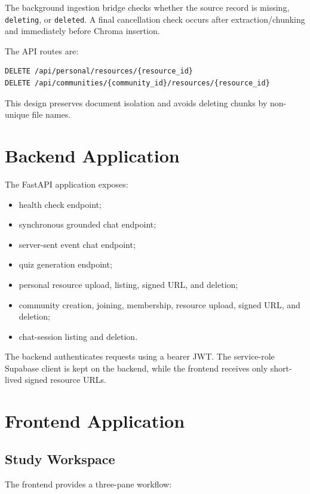 \documentclass[11pt,a4paper]{article}
\begin{document}
The background ingestion bridge checks whether the source record is missing,
\texttt{deleting}, or \texttt{deleted}. A final cancellation check occurs after
extraction/chunking and immediately before Chroma insertion.

The API routes are:

\begin{lstlisting}[language={}]
DELETE /api/personal/resources/{resource_id}
DELETE /api/communities/{community_id}/resources/{resource_id}
\end{lstlisting}

This design preserves document isolation and avoids deleting chunks by
non-unique file names.

\section{Backend Application}

The FastAPI application exposes:

\begin{itemize}[leftmargin=*]
  \item health check endpoint;
  \item synchronous grounded chat endpoint;
  \item server-sent event chat endpoint;
  \item quiz generation endpoint;
  \item personal resource upload, listing, signed URL, and deletion;
  \item community creation, joining, membership, resource upload, signed URL,
        and deletion;
  \item chat-session listing and deletion.
\end{itemize}

The backend authenticates requests using a bearer JWT. The service-role
Supabase client is kept on the backend, while the frontend receives only
short-lived signed resource URLs.

\section{Frontend Application}

\subsection{Study Workspace}

The frontend provides a three-pane workflow:
\end{document}
